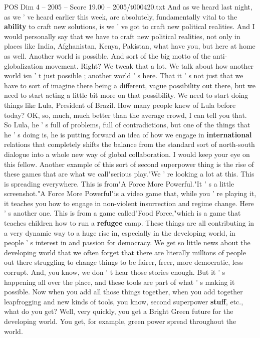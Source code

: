 \begin{textsample}{POS Dim 4 – 2005 – Score 19.00 – 2005/t000420.txt}
And as we heard last night, as we ' ve heard earlier this week, are absolutely, fundamentally vital to the \textbf{ability} to craft new solutions, is we ' ve got to craft new political realities.
And I would personally say that we have to craft new political realities, not only in places like India, Afghanistan, Kenya, Pakistan, what have you, but here at home as well.
Another world is possible.
And sort of the big motto of the anti-globalization movement.
Right?
We tweak that a lot.
We talk about how another world isn ' t just possible ; another world ' s here.
That it ' s not just that we have to sort of imagine there being a different, vague possibility out there, but we need to start acting a little bit more on that possibility.
We need to start doing things like Lula, President of Brazil.
How many people knew of Lula before today?
OK, so, much, much better than the average crowd, I can tell you that.
So Lula, he ' s full of problems, full of contradictions, but one of the things that he ' s doing is, he is putting forward an idea of how we engage in \textbf{international} relations that completely shifts the balance from the standard sort of north-south dialogue into a whole new way of global collaboration.
I would keep your eye on this fellow.
Another example of this sort of second superpower thing is the rise of these games that are what we call"serious play."We ' re looking a lot at this.
This is spreading everywhere.
This is from"A Force More Powerful."It ' s a little screenshot."A Force More Powerful"is a video game that, while you ' re playing it, it teaches you how to engage in non-violent insurrection and regime change.
Here ' s another one.
This is from a game called"Food Force,"which is a game that teaches children how to run a \textbf{refugee} camp.
These things are all contributing in a very dynamic way to a huge rise in, especially in the developing world, in people ' s interest in and passion for democracy.
We get so little news about the developing world that we often forget that there are literally millions of people out there struggling to change things to be fairer, freer, more democratic, less corrupt.
And, you know, we don ' t hear those stories enough.
But it ' s happening all over the place, and these tools are part of what ' s making it possible.
Now when you add all those things together, when you add together leapfrogging and new kinds of tools, you know, second superpower \textbf{stuff}, etc., what do you get?
Well, very quickly, you get a Bright Green future for the developing world.
You get, for example, green power spread throughout the world.

\end{textsample}
